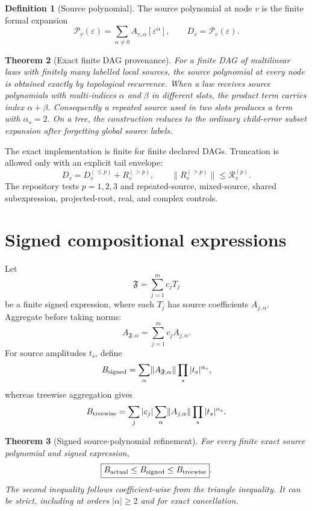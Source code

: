 \documentclass[11pt]{amsart}
\newtheorem{theorem}{Theorem}[section]
\theoremstyle{definition}
\newtheorem{definition}[theorem]{Definition}
\theoremstyle{remark}
\newcommand{\norm}[1]{\lVert#1\rVert}
\newcommand{\cF}{\mathfrak F}
\newcommand{\cP}{\mathcal P}
\begin{document}
\begin{definition}[Source polynomial]
The source polynomial at node $v$ is the finite formal expansion
\[
 \cP_v(\varepsilon)=
 \sum_{\alpha\ne0}A_{v,\alpha}[\varepsilon^\alpha],
 \qquad D_v=\cP_v(\varepsilon).
\]
\end{definition}

\begin{theorem}[Exact finite DAG provenance]
For a finite DAG of multilinear laws with finitely many labelled local
sources, the source polynomial at every node is obtained exactly by topological
recurrence. When a law receives source polynomials with multi-indices $\alpha$
and $\beta$ in different slots, the product term carries index $\alpha+\beta$.
Consequently a repeated source used in two slots produces a term with
$\alpha_s=2$. On a tree, the construction reduces to the ordinary child-error
subset expansion after forgetting global source labels.
\end{theorem}

The exact implementation is finite for finite declared DAGs. Truncation is
allowed only with an explicit tail envelope:
\[
 D_v=D_v^{(\le p)}+R_v^{(>p)},
 \qquad \norm{R_v^{(>p)}}\le\mathcal R_v^{(p)}.
\]
The repository tests $p=1,2,3$ and repeated-source, mixed-source, shared
subexpression, projected-root, real, and complex controls.

\section{Signed compositional expressions}

Let
\[
 \cF=\sum_{j=1}^m c_jT_j
\]
be a finite signed expression, where each $T_j$ has source coefficients
$A_{j,\alpha}$. Aggregate before taking norms:
\[
 A_{\cF,\alpha}=\sum_{j=1}^m c_jA_{j,\alpha}.
\]
For source amplitudes $t_s$, define
\[
 B_{\rm signed}=\sum_\alpha
 \norm{A_{\cF,\alpha}}\prod_s|t_s|^{\alpha_s},
\]
whereas treewise aggregation gives
\[
 B_{\rm treewise}=\sum_j|c_j|\sum_\alpha
 \norm{A_{j,\alpha}}\prod_s|t_s|^{\alpha_s}.
\]

\begin{theorem}[Signed source-polynomial refinement]
\label{thm:signed}
For every finite exact source polynomial and signed expression,
\[
 \boxed{B_{\rm actual}\le B_{\rm signed}\le B_{\rm treewise}}.
\]
The second inequality follows coefficient-wise from the triangle inequality.
It can be strict, including at orders $|\alpha|\ge2$ and for exact
cancellation.
\end{theorem}
\end{document}
